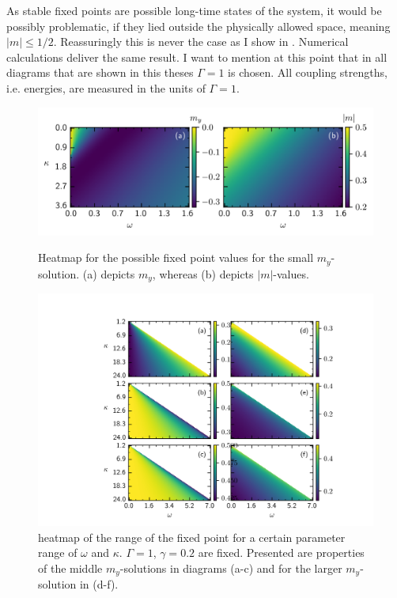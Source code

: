As stable fixed points are possible long-time states of the system, it would be possibly problematic, if they lied outside the physically allowed space, meaning $|m|\leq1/2$. Reassuringly this is never the case as I show in . Numerical calculations deliver the same result. I want to mention at this point that in all diagrams that are shown in this theses $\Gamma=1$ is chosen. All coupling strengths, i.e. energies, are measured in the units of $\Gamma=1$. %
%     
\begin{figure}[H]
    \caption{Heatmap for the possible fixed point values for the small $m_y$-solution. (a) depicts $m_y$, whereas (b) depicts $|m|$-values.}
    \includegraphics{pictures/fixp_bound_heatmap_s_horiz.png}
    \label{fig:fixp_small_bound_hm}
\end{figure}
\begin{figure}[H]
    \hspace*{-1cm}
    \includegraphics{pictures/fixp_bound_heatmap_ml2.png}
    \caption{heatmap of the range of the fixed point for a certain parameter range of $\omega$ and $\kappa$. $\Gamma=1$, $\gamma=0.2$ are fixed. Presented are properties of the middle $m_y$-solutions in diagrams (a-c) and for the larger $m_y$-solution in (d-f).}
    \label{fig:fixp_midlarge_bound_hm}
\end{figure}

